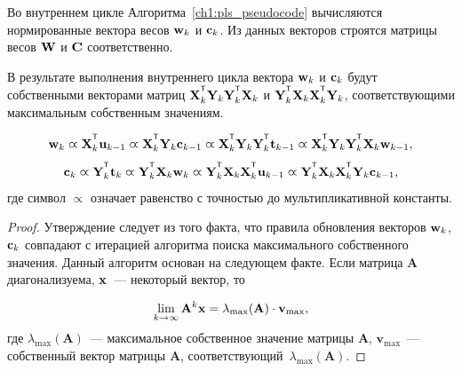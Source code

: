 Во внутреннем цикле Алгоритма~\ref{ch1:pls_pseudocode} вычисляются нормированные вектора весов $\mathbf{w}_k$ и $\mathbf{c}_k$. 
Из данных векторов строятся матрицы весов $\mathbf{W}$ и $\mathbf{C}$ соответственно.

\begin{statement}
	В результате выполнения внутреннего цикла вектора $\mathbf{w}_k$ и $\mathbf{c}_k$ будут собственными векторами матриц $\bX_k^{\T} \bY_k \bY_k^{\T} \bX_k$ и $\bY_k^{\T} \bX_k \bX_k^{\T} \bY_k$, соответствующими максимальным собственным значениям.
	
	\begin{equation*}
		\bw_k \varpropto \bX_k^{\T} \bu_{k-1} \varpropto \bX_k^{\T} \bY_k \bc_{k-1} \varpropto \bX_k^{\T} \bY_k \bY_k^{\T} \bt_{k-1} \varpropto \bX_k^{\T} \bY_k \bY_k^{\T} \bX_k \bw_{k-1},
	\end{equation*}
	\begin{equation*}
		\bc_k \varpropto \bY_k^{\T} \bt_k \varpropto \bY_k^{\T} \bX_k \bw_k \varpropto \bY_k^{\T} \bX_k \bX_k^{\T} \bu_{k-1} \varpropto \bY_k^{\T} \bX_k \bX_k^{\T} \bY_k \bc_{k-1},
	\end{equation*}
	где символ $\varpropto$ означает равенство с точностью до мультипликативной константы. 
	\label{st:eig}
\end{statement}
\begin{proof}
	Утверждение следует из того факта, что правила обновления векторов $\mathbf{w}_k$, $\mathbf{c}_k$ совпадают с итерацией алгоритма поиска максимального собственного значения. 
	Данный алгоритм основан на следующем факте.
	Если матрица $\mathbf{A}$ диагонализуема, $\mathbf{x}$~--- некоторый вектор, то
	
	\[
	\lim_{k \rightarrow \infty} \mathbf{A}^k \mathbf{x} = \lambda_{\max}(\mathbf{A}) \cdot \mathbf{v}_{\max},
	\]
	где $ \lambda_{\max} (\mathbf{A})$~--- максимальное собственное значение матрицы $\mathbf{A}$, $\mathbf{v}_{\max}$~---собственный вектор матрицы $\mathbf{A}$, соответствующий~$\lambda_{\max} (\mathbf{A})$.
	
\end{proof}

